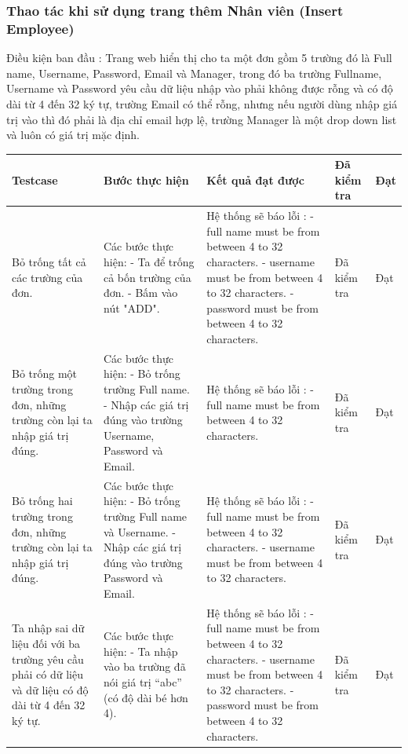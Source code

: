 \documentclass{article}
\begin{document}
\subsubsection{Thao tác khi sử dụng trang thêm Nhân viên  (Insert Employee) }
Điều kiện ban đầu : Trang web hiển thị cho ta một đơn gồm 5 trường đó là Full name, Username, Password, Email và Manager, trong đó ba trường Fullname, Username và Password yêu cầu dữ liệu nhập vào phải không được rỗng và có độ dài từ 4 đến 32 ký tự, trường Email có thể rỗng, nhưng nếu người dùng nhập giá trị vào thì đó phải là địa chỉ email hợp lệ, trường Manager là một drop down list và luôn có giá trị mặc định.  \newline
\begin{longtable}{ | p{} |p{} | p{}  | p{}  | p{}  | } 
\hline
\textbf{Testcase}& \textbf{Bước thực hiện}& \textbf{Kết quả đạt được} & \textbf{Đã kiểm tra}& \textbf{Đạt} \\ 
\hline
\hline
Bỏ trống tất cả các trường của đơn. &
Các bước thực hiện: \newline
- Ta để trống cả bốn trường của đơn.
- Bấm vào nút "ADD".
&
Hệ thống sẽ báo lỗi : 
- full name must be from between 4 to 32 characters. \newline
- username must be from between 4 to 32 characters. \newline
- password must be from between 4 to 32 characters.
&
Đã kiểm tra &
Đạt \\

\hline
Bỏ trống một trường trong đơn, những trường còn lại ta nhập giá trị đúng. 
&
Các bước thực hiện: \newline
- Bỏ trống trường Full name. 
- Nhập các giá trị đúng vào trường Username, Password và Email. 
&
Hệ thống sẽ báo lỗi : 
- full name must be from between 4 to 32 characters.
&
Đã kiểm tra &
Đạt \\

\hline
Bỏ trống hai trường trong đơn, những trường còn lại ta nhập giá trị đúng. 
&
Các bước thực hiện: \newline
- Bỏ trống trường Full name và Username. 
- Nhập các giá trị đúng vào trường Password và Email. 
&
Hệ thống sẽ báo lỗi : 
- full name must be from between 4 to 32 characters.
- username must be from between 4 to 32 characters.
&
Đã kiểm tra &
Đạt \\

\hline
Ta nhập sai dữ liệu đối với ba trường yêu cầu phải có dữ liệu và dữ liệu có độ dài từ 4 đến 32 ký tự. 
&
Các bước thực hiện: \newline
- Ta nhập vào ba trường đã nói giá trị “abc” (có độ dài bé hơn 4). 
&
Hệ thống sẽ báo lỗi : \newline
- full name must be from between 4 to 32 characters. \newline
- username must be from between 4 to 32 characters. \newline
- password must be from between 4 to 32 characters.
&
Đã kiểm tra &
Đạt \\


\end{longtable}
\end{document}

